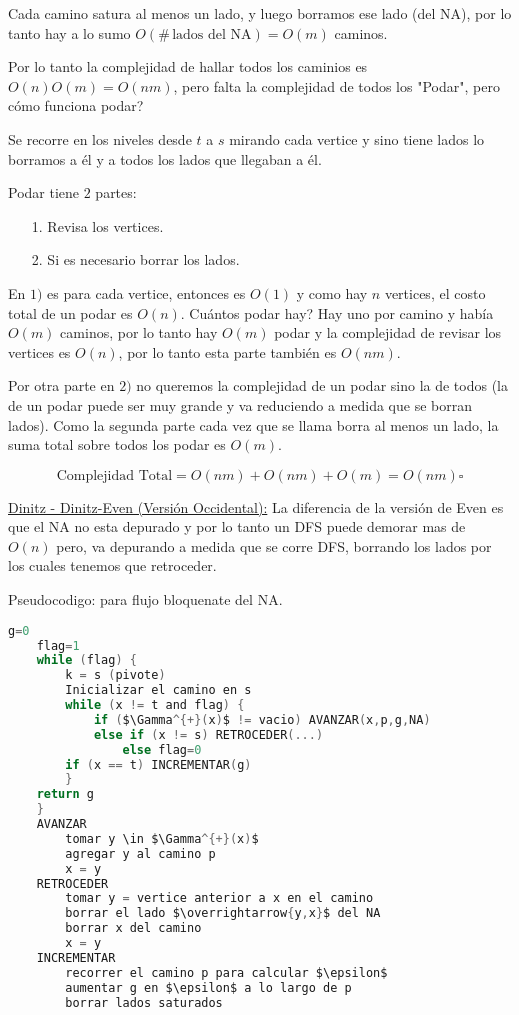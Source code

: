\documentclass[12pt,a4paper]{article}
\begin{document}
Cada camino satura al menos un lado, y luego borramos ese lado (del NA), por lo 
tanto hay a lo sumo $O(\# \,\text{lados del NA}) = O(m)$ caminos.
\medskip

Por lo tanto la complejidad de hallar todos los caminios es $O(n)O(m) = O(nm)$, 
pero falta la complejidad de todos los "Podar", pero cómo funciona podar?
\medskip

Se recorre en los niveles desde $t$ a $s$ mirando cada vertice y sino tiene lados 
lo borramos a él y a todos los lados que llegaban a él.
\medskip

Podar tiene $2$ partes:
\begin{itemize}
    \item [1.] Revisa los vertices.
    \item [2.] Si es necesario borrar los lados.
\end{itemize}

En $1)$ es para cada vertice, entonces es $O(1)$ y como hay $n$ vertices, el costo total 
de un podar es $O(n)$. Cuántos podar hay? Hay uno por camino y había $O(m)$ caminos,
por lo tanto hay $O(m)$ podar y la complejidad de revisar los vertices es $O(n)$,
por lo tanto esta parte también es $O(nm)$.
\medskip

Por otra parte en $2)$ no queremos la complejidad de un podar sino la de todos 
(la de un podar puede ser muy grande y va reduciendo a medida que se borran lados).
Como la segunda parte cada vez que se llama borra al menos un lado, la suma total 
sobre todos los podar es $O(m)$.

$$\text{Complejidad Total} = O(nm) + O(nm) + O(m) = O(nm) \square$$

\underline{Dinitz - Dinitz-Even (Versión Occidental):} La diferencia de la versión 
de Even es que el NA no esta depurado y por lo tanto un DFS puede demorar mas de 
$O(n)$ pero, va depurando a medida que se corre DFS, borrando los lados por los 
cuales tenemos que retroceder.
\medskip

Pseudocodigo: para flujo bloquenate del NA.
\begin{lstlisting}[language=C]
    g=0
    flag=1
    while (flag) {
        k = s (pivote)
        Inicializar el camino en s
        while (x != t and flag) {
            if ($\Gamma^{+}(x)$ != vacio) AVANZAR(x,p,g,NA)
            else if (x != s) RETROCEDER(...)
                else flag=0
        if (x == t) INCREMENTAR(g)
        }
    return g
    }
    AVANZAR
        tomar y \in $\Gamma^{+}(x)$
        agregar y al camino p
        x = y
    RETROCEDER
        tomar y = vertice anterior a x en el camino
        borrar el lado $\overrightarrow{y,x}$ del NA
        borrar x del camino
        x = y 
    INCREMENTAR
        recorrer el camino p para calcular $\epsilon$
        aumentar g en $\epsilon$ a lo largo de p
        borrar lados saturados
\end{lstlisting}
\end{document}
